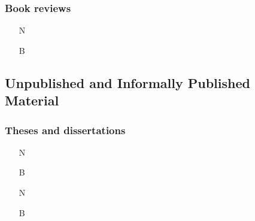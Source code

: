 \documentclass[11pt,letterpaper,oneside]{article}
\begin{document}
\subsubsection{Book reviews}
\label{14.215}

\begin{itemize}
\item[N] 

\item[B] 
\end{itemize}






\setcounter{subsection}{2}
\subsection{Unpublished and Informally Published Material}
\setcounter{subsection}{14}

\setcounter{subsubsection}{223}
\subsubsection{Theses and dissertations}

\begin{itemize}
\item[N] 

\item[B] 

\item[N] 

\item[B] 
\end{itemize}
\end{document}
